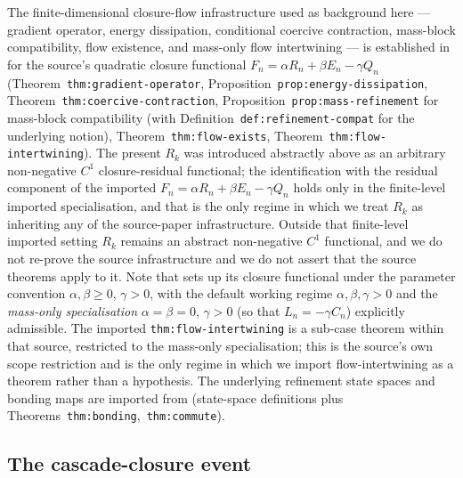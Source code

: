 \documentclass[11pt]{article}
\theoremstyle{definition}
\begin{document}
The finite-dimensional closure-flow infrastructure used as background
here --- gradient operator, energy dissipation, conditional coercive
contraction, mass-block compatibility, flow existence, and mass-only
flow intertwining --- is established in \cite{CascadeClosureDynamics}
for the source's quadratic closure functional
$F_n = \alpha R_n + \beta E_n - \gamma Q_n$
(Theorem~\texttt{thm:gradient-operator}, Proposition~\texttt{prop:energy-dissipation},
Theorem~\texttt{thm:coercive-contraction},
Proposition~\texttt{prop:mass-refinement} for mass-block
compatibility (with Definition~\texttt{def:refinement-compat} for the
underlying notion), Theorem~\texttt{thm:flow-exists},
Theorem~\texttt{thm:flow-intertwining}).
The present $R_k$ was introduced abstractly above as an arbitrary
non-negative $C^1$ closure-residual functional; the identification
with the residual component of the imported $F_n = \alpha R_n + \beta
E_n - \gamma Q_n$ holds only in the finite-level imported
specialisation, and that is the only regime in which we treat
$R_k$ as inheriting any of the source-paper infrastructure. Outside
that finite-level imported setting $R_k$ remains an abstract
non-negative $C^1$ functional, and we do not re-prove the source
infrastructure and we do not assert that the source theorems apply
to it. Note that
\cite{CascadeClosureDynamics} sets up its closure functional under
the parameter convention $\alpha, \beta \geq 0$, $\gamma > 0$, with
the default working regime $\alpha, \beta, \gamma > 0$ and the
\emph{mass-only specialisation} $\alpha = \beta = 0$, $\gamma > 0$
(so that $L_n = -\gamma C_n$) explicitly admissible. The imported
\texttt{thm:flow-intertwining} is a sub-case theorem within that
source, restricted to the mass-only specialisation; this is the
source's own scope restriction and is the only regime in which we
import flow-intertwining as a theorem rather than a hypothesis. The underlying refinement state
spaces and bonding maps are imported from
\cite{CascadeRefinementSpaces}
(state-space definitions plus
Theorems~\texttt{thm:bonding},~\texttt{thm:commute}).

\subsection{The cascade-closure event}
\end{document}
